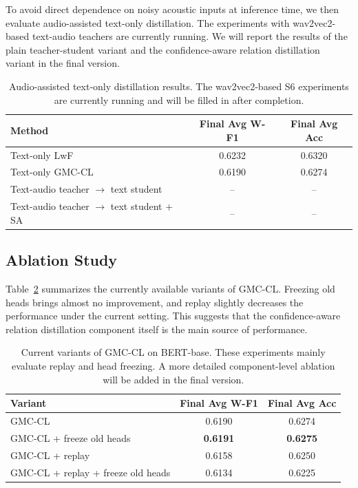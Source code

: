 To avoid direct dependence on noisy acoustic inputs at inference time, we then evaluate audio-assisted text-only distillation. The experiments with wav2vec2-based text-audio teachers are currently running. We will report the results of the plain teacher-student variant and the confidence-aware relation distillation variant in the final version.

\begin{table}[t]
\centering
\caption{Audio-assisted text-only distillation results. The wav2vec2-based S6 experiments are currently running and will be filled in after completion.}
\label{tab:s6_results}
\begin{tabular}{lcc}
\hline
Method & Final Avg W-F1 & Final Avg Acc \\
\hline
Text-only LwF & 0.6232 & 0.6320 \\
Text-only GMC-CL & 0.6190 & 0.6274 \\
Text-audio teacher $\rightarrow$ text student & -- & -- \\
Text-audio teacher $\rightarrow$ text student + SA & -- & -- \\
\hline
\end{tabular}
\end{table}

\subsection{Ablation Study}
\label{subsec:ablation}

Table~\ref{tab:current_ablation} summarizes the currently available variants of GMC-CL. Freezing old heads brings almost no improvement, and replay slightly decreases the performance under the current setting. This suggests that the confidence-aware relation distillation component itself is the main source of performance.

\begin{table}[t]
\centering
\caption{Current variants of GMC-CL on BERT-base. These experiments mainly evaluate replay and head freezing. A more detailed component-level ablation will be added in the final version.}
\label{tab:current_ablation}
\begin{tabular}{lcc}
\hline
Variant & Final Avg W-F1 & Final Avg Acc \\
\hline
GMC-CL & 0.6190 & 0.6274 \\
GMC-CL + freeze old heads & \textbf{0.6191} & \textbf{0.6275} \\
GMC-CL + replay & 0.6158 & 0.6250 \\
GMC-CL + replay + freeze old heads & 0.6134 & 0.6225 \\
\hline
\end{tabular}
\end{table}

